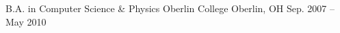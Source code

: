 

\begin{cventries}

  \cventry
    {B.A. in Computer Science \& Physics} %
    {Oberlin College} %
    {Oberlin, OH} %
    {Sep. 2007 – May 2010} %
    {}

\end{cventries}
